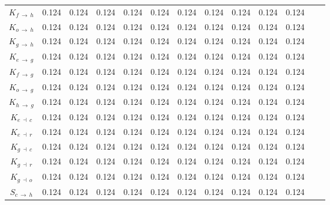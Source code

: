 \begin{ThreePartTable}
\begin{longtable}{c l *{10}{c} c}
        $K_{f \: \rightarrow \: h}$ & 0.124 &  0.124 &  0.124 &  0.124 &  0.124 &  0.124 &  0.124 &  0.124 &  0.124 &  0.124 \\
        
        $K_{o \: \rightarrow \: h}$ & 0.124 &  0.124 &  0.124 &  0.124 &  0.124 &  0.124 &  0.124 &  0.124 &  0.124 &  0.124 \\
        
        $K_{g \: \rightarrow \: h}$ & 0.124 &  0.124 &  0.124 &  0.124 &  0.124 &  0.124 &  0.124 &  0.124 &  0.124 &  0.124 \\
        
        $K_{e \: \rightarrow \: g}$ & 0.124 &  0.124 &  0.124 &  0.124 &  0.124 &  0.124 &  0.124 &  0.124 &  0.124 &  0.124 \\
        
        $K_{f \: \rightarrow \: g}$ & 0.124 &  0.124 &  0.124 &  0.124 &  0.124 &  0.124 &  0.124 &  0.124 &  0.124 &  0.124 \\
        
        $K_{o \: \rightarrow \: g}$ & 0.124 &  0.124 &  0.124 &  0.124 &  0.124 &  0.124 &  0.124 &  0.124 &  0.124 &  0.124 \\
        
        $K_{h \: \rightarrow \: g}$ & 0.124 &  0.124 &  0.124 &  0.124 &  0.124 &  0.124 &  0.124 &  0.124 &  0.124 &  0.124 \\
        
        $K_{e \: \dashv \: c}$ & 0.124 &  0.124 &  0.124 &  0.124 &  0.124 &  0.124 &  0.124 &  0.124 &  0.124 &  0.124 \\
        
        $K_{e \: \dashv \: r}$ & 0.124 &  0.124 &  0.124 &  0.124 &  0.124 &  0.124 &  0.124 &  0.124 &  0.124 &  0.124 \\
        
        $K_{g \: \dashv \: c}$ & 0.124 &  0.124 &  0.124 &  0.124 &  0.124 &  0.124 &  0.124 &  0.124 &  0.124 &  0.124 \\
        
        $K_{g \: \dashv \: r}$ & 0.124 &  0.124 &  0.124 &  0.124 &  0.124 &  0.124 &  0.124 &  0.124 &  0.124 &  0.124 \\
        
        $K_{g \: \dashv \: o}$ & 0.124 &  0.124 &  0.124 &  0.124 &  0.124 &  0.124 &  0.124 &  0.124 &  0.124 &  0.124 \\
        
        $S_{c \: \rightarrow \: h}$\tnote{f} & 0.124 &  0.124 &  0.124 &  0.124 &  0.124 &  0.124 &  0.124 &  0.124 &  0.124 &  0.124 \\
        

\end{longtable}
\end{ThreePartTable}
